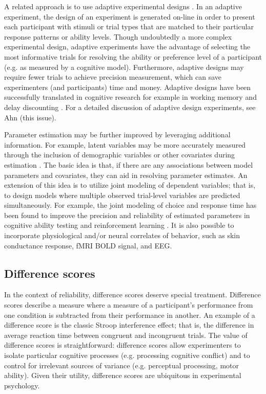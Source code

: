 \documentclass[a4paper,notitlepage,12pt]{article}
\begin{document}
A related approach is to use adaptive experimental designs \cite{myung2013tutorial}. In an adaptive experiment, the design of an experiment is generated on-line in order to present each participant with stimuli or trial types that are matched to their particular response patterns or ability levels. Though undoubtedly a more complex experimental design, adaptive experiments have the advantage of selecting the most informative trials for resolving the ability or preference level of a participant (e.g. as measured by a cognitive model). Furthermore, adaptive designs  may require fewer trials to achieve precision measurement, which can save experimenters (and participants) time and money. Adaptive designs have been successfully translated in cognitive research for example in working memory \cite{gonthier2018measuring} and delay discounting \cite{ahn2020rapid}. For a detailed discussion of adaptive design experiments, see Ahn (this issue). 

Parameter estimation may be further improved by leveraging additional information. For example, latent variables may be more accurately measured through the inclusion of demographic variables or other covariates during estimation \cite{anders2018improved, Curran2016-bt}. The basic idea is that, if there are any associations between model parameters and covariates, they can aid in resolving parameter estimates. An extension of this idea is to utilize joint modeling of dependent variables; that is, to design models where multiple observed trial-level variables are predicted simultaneously. For example, the joint modeling of choice and response time has been found to improve the precision and reliability of estimated parameters in cognitive ability testing \cite{bertling2018using} and reinforcement learning \cite{ballard2019joint, shahar2019improving}. It is also possible to incorporate physiological and/or neural correlates of behavior, such as skin conductance response, fMRI BOLD signal, and EEG. 

\subsection{Difference scores}

In the context of reliability, difference scores deserve special treatment. Difference scores describe a measure where a measure of a participant's performance from one condition is subtracted from their performance in another. An example of a difference score is the classic Stroop interference effect; that is, the difference in average reaction time between congruent and incongruent trials. The value of difference scores is straightforward: difference scores allow experimenters to isolate particular cognitive processes (e.g. processing cognitive conflict) and to control for irrelevant sources of variance (e.g. perceptual processing, motor ability). Given their utility, difference scores are ubiquitous in experimental psychology. 
\end{document}
